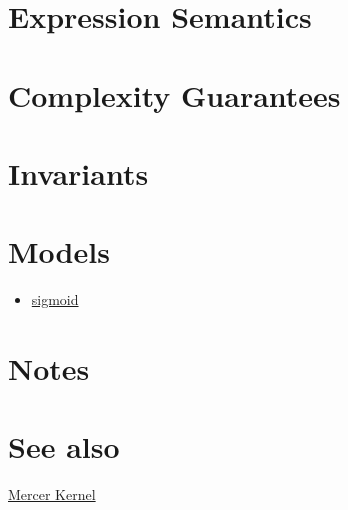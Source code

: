 \documentclass{article}
\begin{document}
\section*{Expression Semantics}

\section*{Complexity Guarantees}

\section*{Invariants}

\section*{Models}
\begin{itemize}
\item \href{\kmlroot/sigmoid.html}{sigmoid}
\end{itemize}

\section*{Notes}

\section*{See also}
\href{\kmlroot/mercer_kernel.html}{Mercer Kernel}




\end{document}
